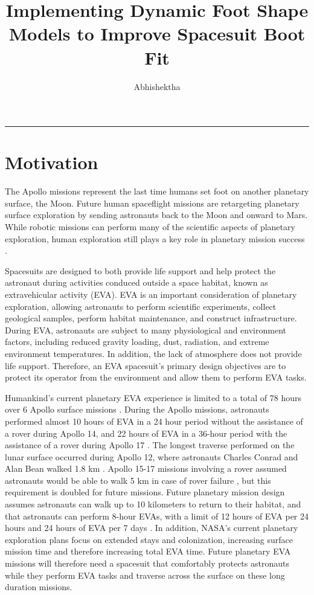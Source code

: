 \documentclass[defaultstyle,11pt]{comps}
\title{Implementing Dynamic Foot Shape Models to Improve Spacesuit Boot Fit}
\author{Abhishektha}{Boppana}
\begin{document}
\begin{center}\rule{0.5\linewidth}{0.5pt}\end{center}

\hypertarget{chapter:motiv}{%
\chapter{Motivation}\label{chapter:motiv}}

The Apollo missions represent the last time humans set foot on another planetary surface, the Moon.
Future human spaceflight missions are retargeting planetary surface exploration by sending astronauts back to the Moon and onward to Mars.
While robotic missions can perform many of the scientific aspects of planetary exploration, human exploration still plays a key role in planetary mission success \citep{Drake2010}.

Spacesuits are designed to both provide life support and help protect the astronaut during activities conduced outside a space habitat, known as extravehicular activity (EVA).
EVA is an important consideration of planetary exploration, allowing astronauts to perform scientific experiments, collect geological samples, perform habitat maintenance, and construct infrastructure.
During EVA, astronauts are subject to many physiological and environment factors, including reduced gravity loading, dust, radiation, and extreme environment temperatures.
In addition, the lack of atmosphere does not provide life support.
Therefore, an EVA spacesuit's primary design objectives are to protect its operator from the environment and allow them to perform EVA tasks.

Humankind's current planetary EVA experience is limited to a total of 78 hours over 6 Apollo surface missions \citep{Portree1997}.
During the Apollo missions, astronauts performed almost 10 hours of EVA in a 24 hour period without the assistance of a rover during Apollo 14, and 22 hours of EVA in a 36-hour period with the assistance of a rover during Apollo 17 \citep{Portree1997}.
The longest traverse performed on the lunar surface occurred during Apollo 12, where astronauts Charles Conrad and Alan Bean walked 1.8 km \citep{Portree1997}.
Apollo 15-17 missions involving a rover assumed astronauts would be able to walk 5 km in case of rover failure \citep{Portree1997}, but this requirement is doubled for future missions.
Future planetary mission design assumes astronauts can walk up to 10 kilometers to return
to their habitat, and that astronauts can perform 8-hour EVAs, with a limit of 12 hours of EVA per 24 hours and 24 hours of EVA per 7 days \citep{Drake2010}.
In addition, NASA's current planetary exploration plans focus on extended stays and colonization, increasing surface mission time and therefore increasing total EVA time.
Future planetary EVA missions will therefore need a spacesuit that comfortably protects astronauts while they perform EVA tasks and traverse across the surface on these long duration missions.
\end{document}

